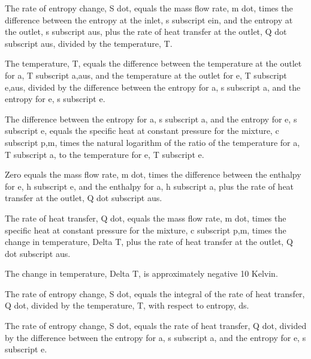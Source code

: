 The rate of entropy change, S dot, equals the mass flow rate, m dot, times the difference between the entropy at the inlet, s subscript ein, and the entropy at the outlet, s subscript aus, plus the rate of heat transfer at the outlet, Q dot subscript aus, divided by the temperature, T.

The temperature, T, equals the difference between the temperature at the outlet for a, T subscript a,aus, and the temperature at the outlet for e, T subscript e,aus, divided by the difference between the entropy for a, s subscript a, and the entropy for e, s subscript e.

The difference between the entropy for a, s subscript a, and the entropy for e, s subscript e, equals the specific heat at constant pressure for the mixture, c subscript p,m, times the natural logarithm of the ratio of the temperature for a, T subscript a, to the temperature for e, T subscript e.

Zero equals the mass flow rate, m dot, times the difference between the enthalpy for e, h subscript e, and the enthalpy for a, h subscript a, plus the rate of heat transfer at the outlet, Q dot subscript aus.

The rate of heat transfer, Q dot, equals the mass flow rate, m dot, times the specific heat at constant pressure for the mixture, c subscript p,m, times the change in temperature, Delta T, plus the rate of heat transfer at the outlet, Q dot subscript aus.

The change in temperature, Delta T, is approximately negative 10 Kelvin.

The rate of entropy change, S dot, equals the integral of the rate of heat transfer, Q dot, divided by the temperature, T, with respect to entropy, ds.

The rate of entropy change, S dot, equals the rate of heat transfer, Q dot, divided by the difference between the entropy for a, s subscript a, and the entropy for e, s subscript e.